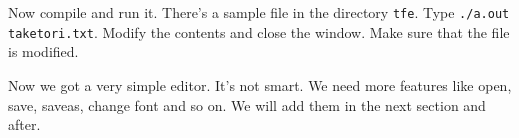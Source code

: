 Now compile and run it. There's a sample file in the directory
\passthrough{\lstinline!tfe!}. Type
\passthrough{\lstinline!./a.out taketori.txt!}. Modify the contents and
close the window. Make sure that the file is modified.

Now we got a very simple editor. It's not smart. We need more features
like open, save, saveas, change font and so on. We will add them in the
next section and after.
